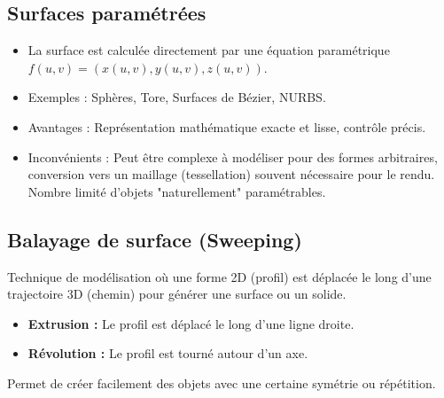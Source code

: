 \documentclass{article}
\begin{document}
\subsection{Surfaces paramétrées}

\begin{itemize}
    \item La surface est calculée directement par une équation paramétrique $f(u, v) = (x(u,v), y(u,v), z(u,v))$.
    \item Exemples : Sphères, Tore, Surfaces de Bézier, NURBS.
    \item Avantages : Représentation mathématique exacte et lisse, contrôle précis.
    \item Inconvénients : Peut être complexe à modéliser pour des formes arbitraires, conversion vers un maillage (tessellation) souvent nécessaire pour le rendu. Nombre limité d'objets "naturellement" paramétrables.
\end{itemize}

\subsection{Balayage de surface (Sweeping)}

Technique de modélisation où une forme 2D (profil) est déplacée le long d'une trajectoire 3D (chemin) pour générer une surface ou un solide.
\begin{itemize}
    \item \textbf{Extrusion :} Le profil est déplacé le long d'une ligne droite.
    \item \textbf{Révolution :} Le profil est tourné autour d'un axe.
\end{itemize}
Permet de créer facilement des objets avec une certaine symétrie ou répétition.
\end{document}
